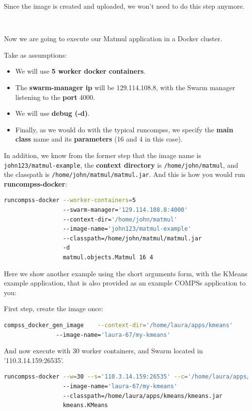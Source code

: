 Since the image is created and uploaded, we won't need to do this step anymore.

~ \newline

Now we are going to execute our Matmul application in a Docker cluster.

Take as assumptions:
\begin{itemize}  
\item We will use \textbf{5 worker docker containers}.
\item The \textbf{swarm-manager ip} will be 129.114.108.8, with the Swarm manager listening to the \textbf{port} 4000.
\item We will use \textbf{debug (-d)}.
\item Finally, as we would do with the typical runcompss, we specify the \textbf{main class} name and its \textbf{parameters} (16 and 4 in this case).
\end{itemize}

In addition, we know from the former step that the image name is \texttt{john123/matmul-example}, 
the \textbf{context directory} is \texttt{/home/john/matmul}, and the classpath is \texttt{/home/john/matmul/matmul.jar}.
And this is how you would run \textbf{runcompss-docker}:

\begin{lstlisting}[language=bash]
runcompss-docker --worker-containers=5
                 --swarm-manager='129.114.108.8:4000'
                 --context-dir='/home/john/matmul'
                 --image-name='john123/matmul-example'
                 --classpath=/home/john/matmul/matmul.jar
                 -d
                 matmul.objects.Matmul 16 4
\end{lstlisting}

Here we show another example using the short arguments form, with the KMeans example application, 
that is also provided as an example COMPSs application to you:

First step, create the image once:
\begin{lstlisting}[language=bash]
compss_docker_gen_image    --context-dir='/home/laura/apps/kmeans'
			   --image-name='laura-67/my-kmeans'
\end{lstlisting}

And now execute with 30 worker containers, and Swarm located in '110.3.14.159:26535'.
\begin{lstlisting}[language=bash]
runcompss-docker --w=30 --s='110.3.14.159:26535' --c='/home/laura/apps/kmeans' 
                 --image-name='laura-67/my-kmeans'
                 --classpath=/home/laura/apps/kmeans/kmeans.jar
                 kmeans.KMeans
\end{lstlisting}           

